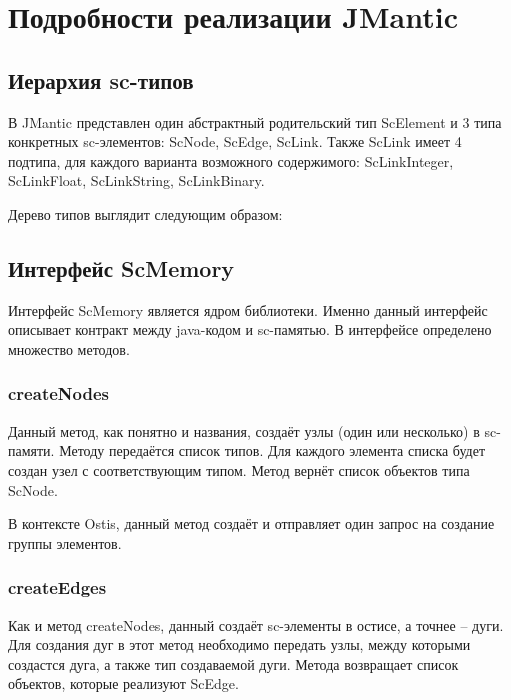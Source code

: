 \section{Подробности реализации JMantic}

\subsection{Иерархия sc-типов}

В JMantic представлен один абстрактный родительский тип ScElement и 3 типа конкретных sc-элементов: ScNode, ScEdge, ScLink. Также ScLink имеет 4 подтипа, для каждого варианта возможного содержимого: ScLinkInteger, ScLinkFloat, ScLinkString, ScLinkBinary.

Дерево типов выглядит следующим образом: 



\subsection{Интерфейс ScMemory}
Интерфейс ScMemory является ядром библиотеки. Именно данный интерфейс описывает контракт между java-кодом и sc-памятью. В интерфейсе определено множество методов.
\subsubsection{createNodes}
Данный метод, как понятно и названия, создаёт узлы (один или несколько) в sc-памяти. Методу передаётся список типов. Для каждого элемента списка будет создан узел с соответствующим типом. Метод вернёт список объектов типа ScNode. 

В контексте Ostis, данный метод создаёт и отправляет один запрос на создание группы элементов. 

\subsubsection{createEdges}
Как и метод createNodes, данный создаёт sc-элементы в остисе, а точнее -- дуги. Для создания дуг в этот метод необходимо передать узлы, между которыми создастся дуга, а также тип создаваемой дуги. Метода возвращает список объектов, которые реализуют ScEdge. 


